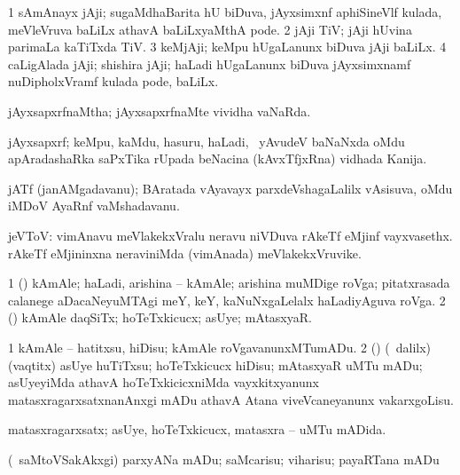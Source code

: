 \noindent
\gl{\pagu}
\bmng
{} 
\bnum
\num{1}  sAmAnayx jAji; sugaMdhaBarita hU biDuva, jAyxsimxnf aphiSineVlf kulada, meVleVruva baLiLx athavA baLiLxyaMthA pode. 
\num{2}  jAji TiV; jAji hUvina parimaLa kaTiTxda TiV. 
\num{3}  keMjAji; keMpu hUgaLanunx biDuva jAji baLiLx. 
\num{4}  caLigAlada jAji; shishira jAji; haLadi hUgaLanunx biDuva jAyxsimxnamf nuDipholxVramf kulada pode, baLiLx. 
\enum
\emng
\eentry

\bentry
{}
\gl{\gu}
\bmng
jAyxsapxrfnaMtha; jAyxsapxrfnaMte vividha vaNaRda. 
\emng
\eentry

\bentry
{}
\gl{\nA}
\bmng
jAyxsapxrf; keMpu, kaMdu, hasuru, haLadi, \mo\ yAvudeV baNaNxda oMdu apAradashaRka saPxTika rUpada beNacina (kAvxTfjxRna) vidhada Kanija. 
\emng
\eentry

\bentry
{}
\gl{\nA}
\bmng
jATf (janAMgadavanu); BAratada vAyavayx parxdeVshagaLalilx vAsisuva, oMdu iMDoV AyaRnf vaMshadavanu. 
\emng
\eentry

\bentry
{}
\gl{\nA}
\bmng
jeVToV: 
\banum
{} vimAnavu meVlakekxVralu neravu niVDuva rAkeTf eMjinf vayxvasethx. 
 rAkeTf eMjininxna neraviniMda (vimAnada) meVlakekxVruvike. 
\eanum
\emng
\eentry


\bentry
{}
\gl{\nA}
\bmng
\bnum
\num{1} (\roVshA) kAmAle; haLadi, arishina -- kAmAle; arishina muMDige roVga; pitatxrasada calanege aDacaNeyuMTAgi meY, keY, kaNuNxgaLelalx haLadiyAguva roVga. 
\num{2} (\rUpa) kAmAle daqSiTx; hoTeTxkicucx; asUye; mAtasxyaR. 
\enum
\emng
\eentry

\bentry
{}
\gl{\sakirx}
\bmng
\bnum
\num{1} kAmAle -- hatitxsu, hiDisu; kAmAle roVgavanunxMTumADu. 
\num{2} (\rUpa) (\kanmu\ \BUkaq dalilx) (vaqtitx) asUye huTiTxsu; hoTeTxkicucx hiDisu; mAtasxyaR uMTu mADu; asUyeyiMda athavA hoTeTxkicicxniMda vayxkitxyanunx matasxragarxsatxnanAnxgi mADu athavA Atana viveVcaneyanunx vakarxgoLisu. 
\enum
\emng
\eentry

\bentry
{}
\gl{\gu}
\bmng
matasxragarxsatx; asUye, hoTeTxkicucx, matasxra -- uMTu mADida. 
\emng
\eentry

\bentry
{}
\gl{\akirx}
\bmng
(\kanmu\ saMtoVSakAkxgi) parxyANa mADu; saMcarisu; viharisu; payaRTana mADu 
\emng
\eentry

